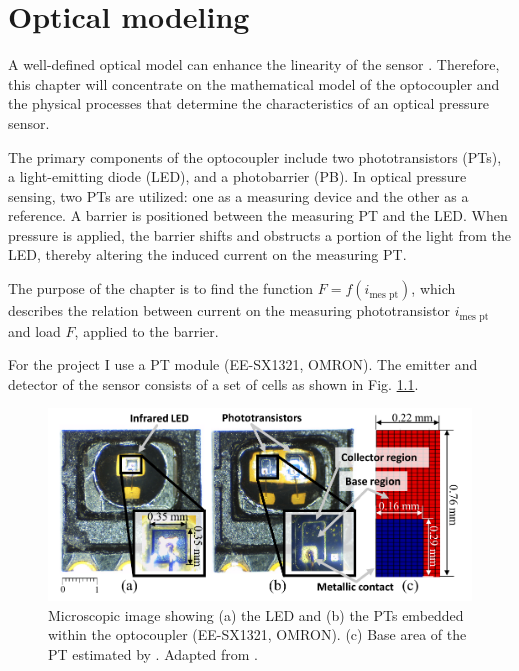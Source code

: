 \chapter{Optical modeling}
\label{chapter:optical_modeling}
A well-defined optical model can enhance the linearity of the sensor \cite{my_love_pressure_photosensor}. Therefore, this chapter will concentrate on the mathematical model of the optocoupler and the physical processes that determine the characteristics of an optical pressure sensor.

The primary components of the optocoupler include two phototransistors (PTs), a light-emitting diode (LED), and a photobarrier (PB). 
In optical pressure sensing, two PTs are utilized: one as a measuring device and the other as a reference. 
A barrier is positioned between the measuring PT and the LED. 
When pressure is applied, the barrier shifts and obstructs a portion of the light from the LED, thereby altering the induced current on the measuring PT.

The purpose of the chapter is to find the function $F = f(i_{\text{mes pt}})$, which describes the relation between current on the measuring phototransistor $i_{\text{mes pt}}$ and load $F$, applied to the barrier.

For the project I use a PT module (EE-SX1321, OMRON). 
The emitter and detector of the sensor consists of a set of cells as shown in Fig. \ref{fig:microscopic_image}.

\begin{figure}[H]
  \includegraphics[width=\textwidth]{figs/Microscopic_image.png}
    \centering
    \caption{ Microscopic image showing (a) the LED and (b) the PTs embedded within the optocoupler (EE-SX1321, OMRON). 
    (c) Base area of the PT estimated by \cite[Fig. 4]{my_love_pressure_photosensor}.
    Adapted from \cite[Fig. 4]{my_love_pressure_photosensor}.}
    \label{fig:microscopic_image}
\end{figure}

